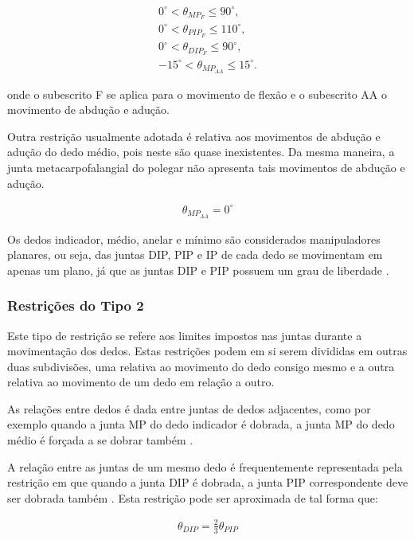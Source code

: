 \begin{align}
0^\circ < \theta_{MP_F} \leq 90^\circ, \\
0^\circ < \theta_{PIP_F} \leq 110^\circ, \\
0^\circ < \theta_{DIP_F} \leq 90^\circ, \\
-15^\circ < \theta_{MP_{AA}} \leq 15^\circ.
\end{align}

onde o subescrito F se aplica para o movimento de flexão e o subescrito AA o movimento de abdução e adução.

Outra restrição usualmente adotada é relativa aos movimentos de abdução e adução do dedo médio, pois neste são quase inexistentes. Da mesma maneira, a junta metacarpofalangial do polegar não apresenta tais movimentos de abdução e adução.

\begin{align}
\theta_{MP_{AA}} = 0^\circ
\end{align}

Os dedos indicador, médio, anelar e mínimo são considerados manipuladores planares, ou seja, das juntas DIP, PIP e IP de cada dedo se movimentam em apenas um plano, já que as juntas DIP e PIP possuem um grau de liberdade \cite{lin2000modeling}.

\subsubsection{Restrições do Tipo 2}\label{sssec:Tipo2}
Este tipo de restrição se refere aos limites impostos nas juntas durante a movimentação dos dedos. Estas restrições podem em si serem divididas em outras duas subdivisões, uma relativa ao movimento do dedo consigo mesmo e a outra relativa ao movimento de um dedo em relação a outro.

As relações entre dedos é dada entre juntas de dedos adjacentes, como por exemplo quando a junta MP do dedo indicador é dobrada, a junta MP do dedo médio é forçada a se dobrar também \cite{lin2000modeling}.

A relação entre as juntas de um mesmo dedo é frequentemente representada pela restrição em que quando a junta DIP é dobrada, a junta PIP correspondente deve ser dobrada também \cite{lin2000modeling}\cite{lee1995model}. Esta restrição pode ser aproximada de tal forma que:

\begin{align}
\theta_{DIP} = \frac{2}{3} \theta_{PIP}
\end{align}

